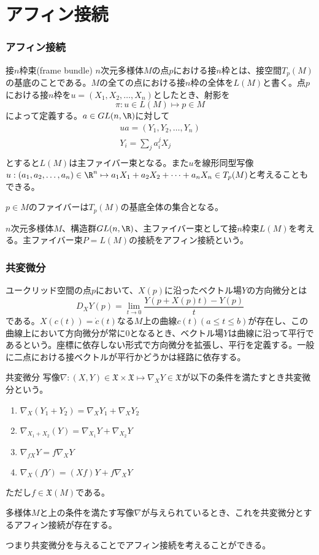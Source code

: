 \part{アフィン接続}

\section{アフィン接続}
	\begin{dfn}{接$n$枠束(frame bundle)}
		$n$次元多様体$M$の点$p$における接$n$枠とは、接空間$T_p(M)$の基底のことである。$M$の全ての点における接$n$枠の全体を$L(M)$と書く。点$p$における接$n$枠を$u = (X_1, X_2, \dots, X_n)$としたとき、射影を
			\[\pi: u \in L(M) \mapsto p \in M\]
		によって定義する。$a \in GL(n, \R)$に対して
		\begin{gather*}
			ua = (Y_1, Y_2, \dots, Y_n)\\
			Y_i = \sum_j a_i^jX_j\\
		\end{gather*}
		とすると$L(M)$は主ファイバー束となる。また$u$を線形同型写像$u: (a_1, a_2, \dots, a_n) \in \R^n \mapsto a_1X_1 + a_2X_2 + \dots + a_nX_n \in T_p(M)$と考えることもできる。
	\end{dfn}
	$p \in M$のファイバーは$T_p(M)$の基底全体の集合となる。

	$n$次元多様体$M$、構造群$GL(n, \R)$、主ファイバー束として接$n$枠束$L(M)$を考える。主ファイバー束$P = L(M)$の接続をアフィン接続という。

\section{共変微分}
	ユークリッド空間の点$p$において、$X(p)$に沿ったベクトル場$Y$の方向微分とは
		\[D_XY(p) = \lim_{t \to 0} \frac{Y(p + X(p)t) - Y(p)}{t}\]
	である。$X(c(t)) = \dot{c}(t)$なる$M$上の曲線$c(t)(a \leq t \leq b)$が存在し、この曲線上において方向微分が常に0となるとき、ベクトル場$Y$は曲線に沿って平行であるという。座標に依存しない形式で方向微分を拡張し、平行を定義する。一般に二点における接ベクトルが平行かどうかは経路に依存する。
	\begin{dfn}{共変微分}
		写像$\nabla: (X, Y) \in \mathfrak{X} \times \mathfrak{X} \mapsto \nabla_XY \in \mathfrak{X}$が以下の条件を満たすとき共変微分という。
		\begin{enumerate}
			\item $\nabla_X(Y_1 + Y_2) = \nabla_XY_1 + \nabla_XY_2$
			\item $\nabla_{X_1 + X_2}(Y) = \nabla_{X_1}Y + \nabla_{X_2}Y$
			\item $\nabla_{fX}Y = f\nabla_XY$
			\item $\nabla_X(fY) = (Xf)Y + f\nabla_XY$
		\end{enumerate}
		ただし$f \in \mathfrak{X}(M)$である。
	\end{dfn}
	\begin{thm}
		多様体$M$と上の条件を満たす写像$\nabla$が与えられているとき、これを共変微分とするアフィン接続が存在する。
	\end{thm}
	つまり共変微分を与えることでアフィン接続を考えることができる。

